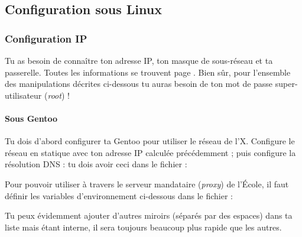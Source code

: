 




\subsection{Configuration sous Linux}

\subsubsection{Configuration IP}
Tu as besoin de conna\^itre ton adresse IP, ton masque de sous-r\'eseau et ta  passerelle. Toutes les informations se trouvent page \pageref{calcul_ip}. Bien s\^ur, pour  l'ensemble des manipulations d\'ecrites ci-dessous tu auras besoin de ton  mot de passe super-utilisateur (\emph{root}) !

\paragraph{Sous Gentoo}
Tu dois d'abord configurer ta Gentoo pour utiliser le r\'eseau de l'X. Configure le r\'eseau en statique avec ton adresse IP calcul\'ee pr\'ec\'edemment ; 
puis configure la r\'esolution DNS : tu dois avoir ceci dans le fichier  :
\noindent {}

\label{gentoo_mirror} Pour pouvoir utiliser  \`a  travers le serveur mandataire (\emph{proxy}) de l'\'Ecole, il faut d\'efinir les variables d'environnement
ci-dessous dans le fichier  :

Tu peux \'evidemment ajouter d'autres miroirs (s\'epar\'es par des espaces) dans ta liste mais
 \'etant interne, il sera toujours beaucoup plus rapide que les autres.

